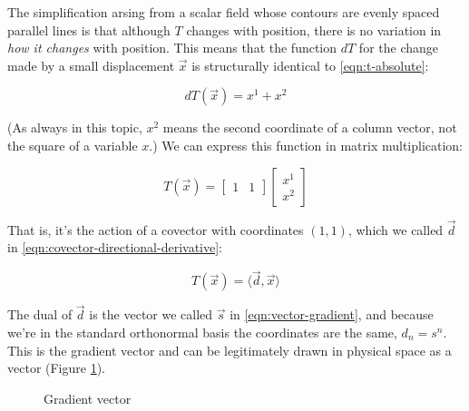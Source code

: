 The simplification arsing from a scalar field whose contours are evenly spaced parallel lines is that although $T$ changes with position, there is no variation in \textit{how it changes} with position. This means that the function $dT$ for the change made by a small displacement $\vec{x}$ is structurally identical to \eqref{eqn:t-absolute}:

\begin{equation}
    dT(\vec{x}) = x^1 + x^2
    \label{eqn:t-rel}
\end{equation}

(As always in this topic, $x^2$ means the second coordinate of a column vector, not the square of a variable $x$.) We can express this function in matrix multiplication:

\begin{equation}
    T(\vec{x}) = 
    \begin{bmatrix}1 & 1\end{bmatrix}
    \begin{bmatrix}x^1 \\ x^2\end{bmatrix}
    \label{eqn:t-rel-matrices}
\end{equation}

That is, it's the action of a covector with coordinates $(1, 1)$, which we called $\vec{d}$ in \eqref{eqn:covector-directional-derivative}:

$$
T(\vec{x}) = \langle \vec{d}, \vec{x} \rangle
$$

The dual of $\vec{d}$ is the vector we called $\vec{s}$ in \eqref{eqn:vector-gradient}, and because we're in the standard orthonormal basis the coordinates are the same, $d_n = s^n$. This is the gradient vector and can be legitimately drawn in physical space as a vector (Figure \ref{fig:gradient-vector}).

\begin{figure}[h]
    \caption{Gradient vector}
    \centering
    \label{fig:gradient-vector}
\end{figure}

